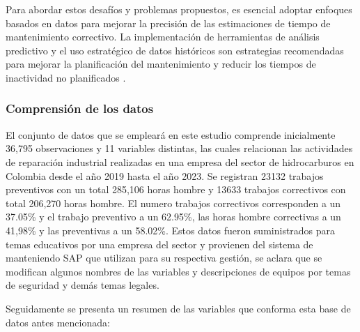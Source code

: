 \documentclass[
  11pt,
  bookmarksnumbered]{article}
\begin{document}
Para abordar estos desafíos y problemas propuestos, es esencial adoptar enfoques basados en datos para mejorar la precisión de las estimaciones de tiempo de mantenimiento correctivo.
La implementación de herramientas de análisis predictivo y el uso estratégico de datos históricos son estrategias recomendadas para mejorar la planificación del mantenimiento y reducir los tiempos de inactividad no planificados \textcite{Morales2020}.

\hypertarget{comprensiuxf3n-de-los-datos}{%
\subsubsection{Comprensión de los datos}\label{comprensiuxf3n-de-los-datos}}

El conjunto de datos que se empleará en este estudio comprende inicialmente 36,795 observaciones y 11 variables distintas, las cuales relacionan las actividades de reparación industrial realizadas en una empresa del sector de hidrocarburos en Colombia desde el año 2019 hasta el año 2023.
Se registran 23132 trabajos preventivos con un total 285,106 horas hombre y 13633 trabajos correctivos con total 206,270 horas hombre.
El numero trabajos correctivos corresponden a un 37.05\% y el trabajo preventivo a un 62.95\%, las horas hombre correctivas a un 41,98\% y las preventivas a un 58.02\%.
Estos datos fueron suministrados para temas educativos por una empresa del sector y provienen del sistema de manteniendo SAP que utilizan para su respectiva gestión, se aclara que se modifican algunos nombres de las variables y descripciones de equipos por temas de seguridad y demás temas legales.

Seguidamente se presenta un resumen de las variables que conforma esta base de datos antes mencionada:
\end{document}
